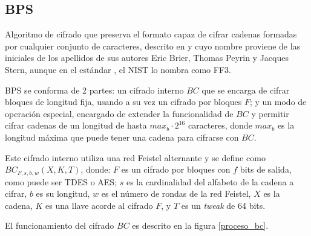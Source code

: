 %
%

\subsection{BPS}


Algoritmo de cifrado que preserva el formato capaz de cifrar cadenas formadas
por cualquier conjunto de caracteres, descrito en \cite{bps} y cuyo nombre
proviene de las iniciales de los apellidos de sus autores Eric Brier, Thomas
Peyrin y Jacques Stern, aunque en el estándar \cite{nist_fpe}, el NIST lo
nombra como FF3.

BPS se conforma de 2 partes: un cifrado interno $BC$ que se encarga de cifrar
bloques de longitud fija, usando a su vez un cifrado por bloques $F$; y un modo
de operación especial, encargado de extender la funcionalidad de $BC$ y permitir
cifrar cadenas de un longitud de hasta $max_b \cdot 2^{16}$ caracteres, donde
$max_b$ es la longitud máxima que puede tener una cadena para cifrarse con $BC$.

Este cifrado interno utiliza una red Feistel alternante y se define como
$BC_{F,s,b,w}(X,K,T)$, donde: $F$ es un cifrado por bloques con $f$ bits de
salida, como puede ser TDES o AES; $s$ es la cardinalidad del alfabeto de la
cadena a cifrar, $b$ es su longitud, $w$ es el número de rondas de la red
Feistel, $X$ es la cadena, $K$ es una llave acorde al cifrado $F$, y $T$ es
un \textit{tweak} de 64 bits.

El funcionamiento del cifrado $BC$ es descrito en la figura \ref{proceso_bc}.

